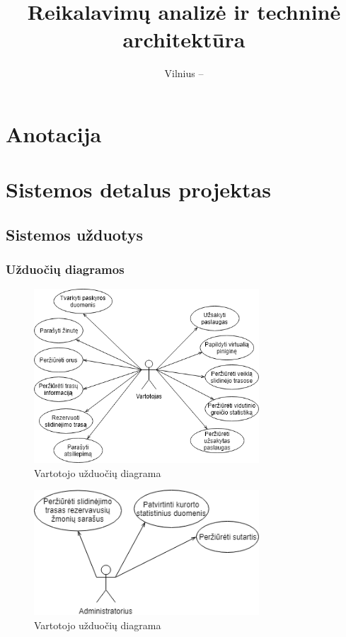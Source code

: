 \documentclass[oneside]{VUMIFPSkursinis}
\title{Reikalavimų analizė ir techninė architektūra}
\date{Vilnius – \the\year}
\begin{document}
\maketitle
\tableofcontents

\section{Anotacija}

\section{Sistemos detalus projektas}
	\subsection{Sistemos užduotys}
		\subsubsection{Užduočių diagramos}

			\begin{figure}[h]
    				\centering
    				\includegraphics[width=0.75\textwidth]{useCaseVartotojas.png}
    				\caption{Vartotojo užduočių diagrama}
    				\label{fig:VartotojoUseCasel}
			\end{figure}

			\begin{figure}[h]
    				\centering
    				\includegraphics[width=0.75\textwidth]{useCaseAdministratorius.png}
    				\caption{Vartotojo užduočių diagrama}
    				\label{fig:VartotojoUseCasel}
			\end{figure}
\end{document}
